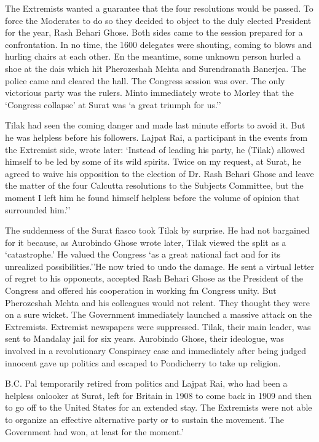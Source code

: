 The Extremists wanted a guarantee that the four resolutions would be passed. To force the Moderates to do so they decided to object to the duly elected President for the year, Rash Behari Ghose. Both sides came to the session prepared for a confrontation. In no time, the 1600 delegates were shouting, coming to blows and hurling chairs at each other. En the meantime, some unknown person hurled a shoe at the dais which hit Pherozeshah Mehta and Surendranath Banerjea. The police came and cleared the hall. The Congress session was over. The only victorious party was the rulers. Minto immediately wrote to Morley that the `Congress collapse' at Surat was `a great triumph for us.''

Tilak had seen the coming danger and made last minute efforts to avoid it. But he was helpless before his followers. Lajpat Rai, a participant in the events from the Extremist side, wrote later: `Instead of leading his party, he (Tilak) allowed himself to be led by some of its wild spirits. Twice on my request, at Surat, he agreed to waive his opposition to the election of Dr. Rash Behari Ghose and leave the matter of the four Calcutta resolutions to the Subjects Committee, but the moment I left him he found himself helpless before the volume of opinion that surrounded him.''

The suddenness of the Surat fiasco took Tilak by surprise. He had not bargained for it because, as Aurobindo Ghose wrote later, Tilak viewed the split as a `catastrophe.' He valued the Congress `as a great national fact and for its unrealized possibilities.''He now tried to undo the damage. He sent a virtual letter of regret to his opponents, accepted Rash Behari Ghose as the President of the Congress and offered his cooperation in working fm Congress unity. But Pherozeshah Mehta and his colleagues would not relent. They thought they were on a sure wicket. The Government immediately launched a massive attack on the Extremists. Extremist newspapers were suppressed. Tilak, their main leader, was sent to Mandalay jail for six years. Aurobindo Ghose, their ideologue, was involved in a revolutionary Conspiracy case and immediately after being judged innocent gave up politics and escaped to Pondicherry to take up religion.

B.C. Pal temporarily retired from politics and Lajpat Rai, who had been a helpless onlooker at Surat, left for Britain in 1908 to come back in 1909 and then to go off to the United States for an extended stay. The Extremists were not able to organize an effective alternative party or to sustain the movement. The Government had won, at least for the moment.'

